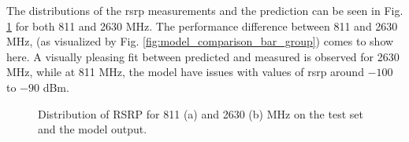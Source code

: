 The distributions of the \gls{rsrp} measurements and the prediction can be seen in Fig. \ref{fig:dist_pred_target} for both 811 and 2630 MHz. The performance difference between 811 and 2630 MHz, (as visualized by Fig. \ref{fig:model_comparison_bar_group}) comes to show here. A visually pleasing fit between predicted and measured is observed for 2630 MHz, while at 811 MHz, the model have issues with values of \gls{rsrp} around $-100$ to $-90$ dBm.

\begin{figure}
    \centering
    \caption{Distribution of RSRP for 811 (a) and 2630 (b) MHz on the test set and the model output.}
    \label{fig:dist_pred_target}
\end{figure}

